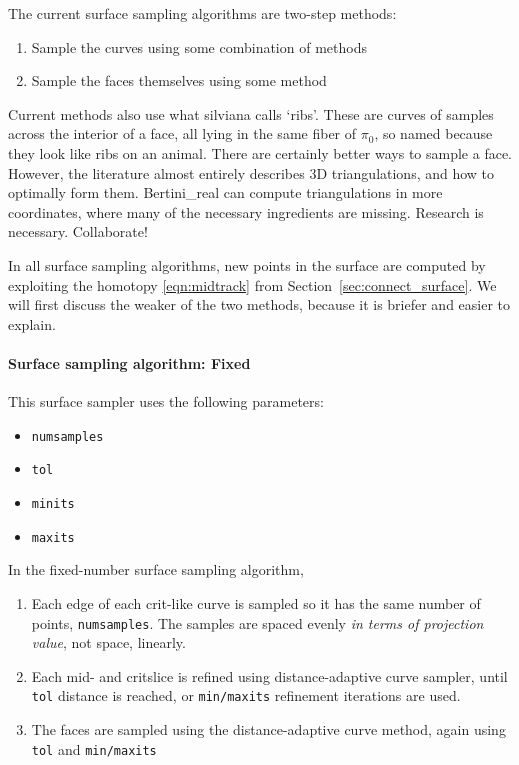 The current surface sampling algorithms are two-step methods:
\begin{enumerate}
\item Sample the curves using some combination of methods
\item Sample the faces themselves using some method
\end{enumerate}



Current methods also use what silviana calls `ribs'.  These are curves of samples across the interior of a face, all lying in the same fiber of $\pi_0$, so named because they look like ribs on an animal.  There are certainly better ways to sample a face.  However, the literature almost entirely describes 3D triangulations, and how to optimally form them.  Bertini\_real can compute triangulations in more coordinates, where many of the necessary ingredients are missing.  Research is necessary.  Collaborate!

In all surface sampling algorithms, new points in the surface are computed by exploiting the homotopy \eqref{eqn:midtrack} from Section~\ref{sec:connect_surface}.  We will first discuss the weaker of the two methods, because it is briefer and easier to explain.












\paragraph{Surface sampling algorithm: Fixed}

This surface sampler uses the following parameters:
\begin{itemize}[noitemsep]
\item {\tt numsamples}
\item {\tt tol}
\item {\tt minits}
  \item {\tt maxits}
\end{itemize}

In the fixed-number surface sampling algorithm, 
\begin{enumerate}
\item Each edge of each crit-like curve is sampled so it has the same number of points, {\tt numsamples}.  The samples are spaced evenly {\em in terms of projection value}, not space, linearly.  

\item Each mid- and critslice is refined using distance-adaptive curve sampler, until {\tt tol} distance is reached, or {\tt min/maxits} refinement iterations are used.

\item The faces are sampled using the distance-adaptive curve method, again using {\tt tol} and {\tt min/maxits}
\end{enumerate}

